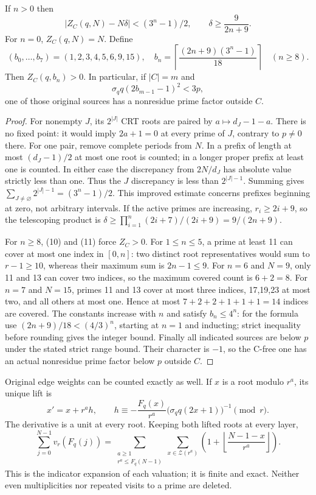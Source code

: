 \begin{theorem}\label{thm:prefix}
If $n>0$ then
\[
 \boxed{|Z_C(q,N)-N\delta|<(3^n-1)/2,\qquad
 \delta\ge\frac9{2n+9}.}                              \tag{10}
\]
For $n=0$, $Z_C(q,N)=N$. Define
\[
 (b_0,\ldots,b_7)=(1,2,3,4,5,6,9,15),\quad
 b_n=\left\lceil\frac{(2n+9)(3^n-1)}{18}\right\rceil\quad(n\ge8).
                                                               \tag{11}
\]
Then $Z_C(q,b_n)>0$. In particular, if $|C|=m$ and
\[
 \sigma_q q(2b_{m-1}-1)^2<3p,
\]
one of those original sources has a nonresidue prime factor outside $C$.
\end{theorem}
\begin{proof}
For nonempty $J$, its $2^{|J|}$ CRT roots are paired by $a\mapsto d_J-1-a$.
There is no fixed point: it would imply $2a+1=0$ at every prime of $J$, contrary
to $p\ne0$ there. For one pair, remove complete periods from $N$. In a prefix of
length at most $(d_J-1)/2$ at most one root is counted; in a longer proper prefix
at least one is counted. In either case the discrepancy from $2N/d_J$ has
absolute value strictly less than one. Thus the $J$ discrepancy is less than
$2^{|J|-1}$. Summing gives
$\sum_{J\ne\varnothing}2^{|J|-1}=(3^n-1)/2$.
This improved estimate concerns prefixes beginning at zero, not arbitrary intervals.
If the active primes are increasing, $r_i\ge2i+9$, so the telescoping product is
$\delta\ge\prod_{i=1}^n(2i+7)/(2i+9)=9/(2n+9)$.

For $n\ge8$, (10) and (11) force $Z_C>0$. For $1\le n\le5$, a prime at least
11 can cover at most one index in $[0,n]$: two distinct root representatives
would sum to $r-1\ge10$, whereas their maximum sum is $2n-1\le9$.
For $n=6$ and $N=9$, only 11 and 13 can cover two indices, so the maximum covered
count is $6+2=8$. For $n=7$ and $N=15$, primes 11 and 13 cover at most three
indices, 17,19,23 at most two, and all others at most one. Hence at most
$7+2+2+1+1+1=14$ indices are covered. The constants increase with $n$ and satisfy
$b_n\le4^n$: for the formula use $(2n+9)/18<(4/3)^n$, starting at $n=1$ and
inducting; strict inequality before rounding gives the integer bound.
Finally all indicated sources are below $p$ under the stated strict range bound.
Their character is $-1$, so the C-free one has an actual nonresidue prime factor
below $p$ outside $C$.
\end{proof}

Original edge weights can be counted exactly as well. If $x$ is a root modulo
$r^a$, its unique lift is
\[
 x'=x+r^ah,\qquad h\equiv-\frac{F_q(x)}{r^a}
                 \bigl(\sigma_q q(2x+1)\bigr)^{-1}\pmod r.       \tag{12}
\]
The derivative is a unit at every root. Keeping both lifted roots at every layer,
\[
 \boxed{\sum_{j=0}^{N-1}v_r(F_q(j))=
 \sum_{\substack{a\ge1\\r^a\le F_q(N-1)}}
 \sum_{x\in\mathcal Z(r^a)}
 \left(1+\left\lfloor\frac{N-1-x}{r^a}\right\rfloor\right).}     \tag{13}
\]
This is the indicator expansion of each valuation; it is finite and exact.
Neither even multiplicities nor repeated visits to a prime are deleted.


